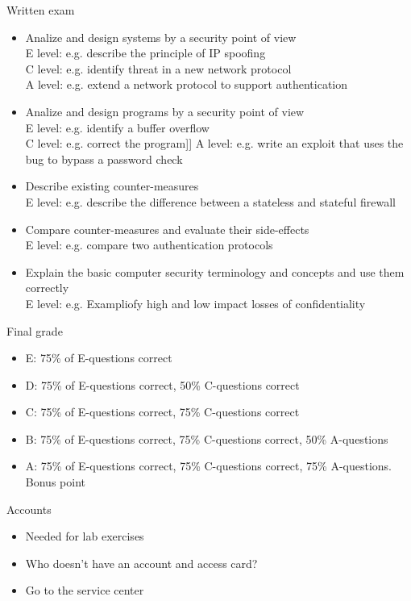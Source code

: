 \documentclass{beamer}
\begin{document}
\begin{frame}{Written exam}
  \begin{itemize}
\item Analize and design systems by a security point of view\\
E level: e.g. describe the principle of IP spoofing\\
C level: e.g. identify threat in a new network protocol\\
A level: e.g. extend a network protocol to support authentication
\item Analize and design programs by a security point of view\\
E level: e.g. identify a buffer overflow\\
C level: e.g. correct the program]]
A level: e.g. write an exploit that uses the bug to bypass a password check
\item Describe existing counter-measures\\
E level: e.g. describe the difference between a stateless and stateful firewall
\item Compare counter-measures and evaluate their side-effects\\
E level: e.g. compare two authentication protocols
\item Explain the basic computer security terminology and concepts and use them correctly\\
E level: e.g. Exampliofy high and low impact losses of confidentiality
  \end{itemize}
  \end{frame}


\begin{frame}{Final grade}
  \begin{itemize}
  \item E: 75\% of E-questions correct
  \item D: 75\% of E-questions correct, 50\% C-questions correct
  \item C: 75\% of E-questions correct, 75\% C-questions correct
  \item B: 75\% of E-questions correct, 75\% C-questions correct, 50\%
    A-questions
  \item A: 75\% of E-questions correct, 75\% C-questions correct, 75\%
    A-questions. Bonus point
  \end{itemize}
\end{frame}

\begin{frame}{Accounts}
  \begin{itemize}
  \item Needed for lab exercises
  \item Who doesn't have an account and access card?
  \item Go to the service center
  \end{itemize}
\end{frame}
\end{document}
